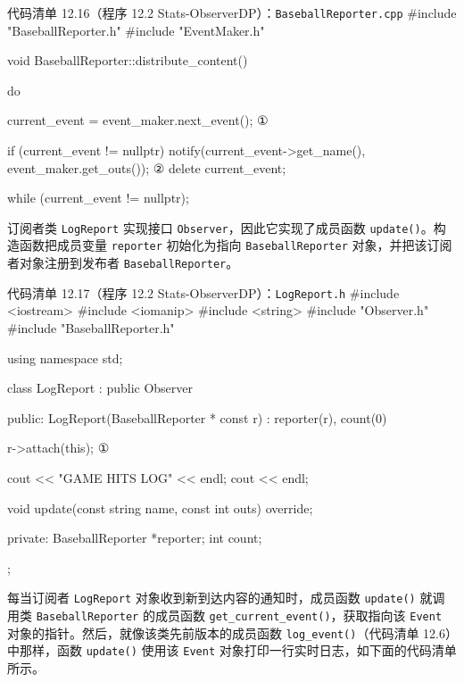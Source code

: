 \begin{codeboxt}{代码清单 12.16（程序 12.2 Stats-ObserverDP）：\texttt{Baseball\allowbreak{}Reporter.\allowbreak{}cpp}}
#include "BaseballReporter.h"
#include "EventMaker.h"

void BaseballReporter::distribute_content()
{
    do
    {
        current_event = event_maker.next_event(); ①

        if (current_event != nullptr)
        {
            notify(current_event->get_name(),
                   event_maker.get_outs());       ②
            delete current_event;
        }
    } while (current_event != nullptr);
}
\end{codeboxt}
\par
{}\par

订阅者类 \texttt{LogReport} 实现接口 \texttt{Observer}，因此它实现了成员函数 \texttt{update()}。构造函数把成员变量 \texttt{reporter} 初始化为指向 \texttt{Baseball\allowbreak{}Reporter} 对象，并把该订阅者对象注册到发布者 \texttt{Baseball\allowbreak{}Reporter}。

\begin{codeboxt}{代码清单 12.17（程序 12.2 Stats-ObserverDP）：\texttt{Log\allowbreak{}Report.\allowbreak{}h}}
#include <iostream>
#include <iomanip>
#include <string>
#include "Observer.h"
#include "BaseballReporter.h"

using namespace std;

class LogReport : public Observer
{
public:
    LogReport(BaseballReporter * const r) : reporter(r), count(0)
    {
        r->attach(this);                                       ①

        cout << "GAME HITS LOG" << endl;
        cout << endl;
    }

    void update(const string name, const int outs) override;

private:
    BaseballReporter *reporter;
    int count;
};
\end{codeboxt}
\par

每当订阅者 \texttt{LogReport} 对象收到新到达内容的通知时，成员函数 \texttt{update()} 就调用类 \texttt{Baseball\allowbreak{}Reporter} 的成员函数 \texttt{get\_\allowbreak{}current\_\allowbreak{}event(\allowbreak{})\allowbreak{}}，获取指向该 \texttt{Event} 对象的指针。然后，就像该类先前版本的成员函数 \texttt{log\_\allowbreak{}event(\allowbreak{})\allowbreak{}}（代码清单 12.6）中那样，函数 \texttt{update()} 使用该 \texttt{Event} 对象打印一行实时日志，如下面的代码清单所示。

